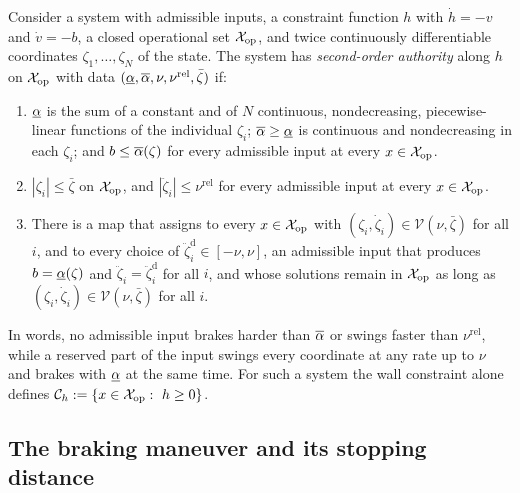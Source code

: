 \begin{definition}\label{def:class}
Consider a system with admissible inputs, a constraint function $h$ with $\dot h=-v$ and $\dot v=-b$, a closed operational set $\mathcal{X}_{\mathrm{op}}$, and twice continuously differentiable coordinates $\zeta_1,\dots,\zeta_N$ of the state. The system has \emph{second-order authority} along $h$ on $\mathcal{X}_{\mathrm{op}}$ with data $(\underline{\alpha},\overline{\alpha},\nu,\nu^{\mathrm{rel}},\bar\zeta)$ if:
\begin{enumerate}
\item[(C1)] $\underline{\alpha}$ is the sum of a constant and of $N$ continuous, nondecreasing, piecewise-linear functions of the individual $\zeta_i$; $\overline{\alpha}\ge\underline{\alpha}$ is continuous and nondecreasing in each $\zeta_i$; and $b\le\overline{\alpha}(\zeta)$ for every admissible input at every $x\in\mathcal{X}_{\mathrm{op}}$.
\item[(C2)] $|\zeta_i|\le\bar\zeta$ on $\mathcal{X}_{\mathrm{op}}$, and $|\ddot\zeta_i|\le\nu^{\mathrm{rel}}$ for every admissible input at every $x\in\mathcal{X}_{\mathrm{op}}$.
\item[(C3)] There is a map that assigns to every $x\in\mathcal{X}_{\mathrm{op}}$ with $(\zeta_i,\dot\zeta_i)\in\mathcal{V}(\nu,\bar\zeta)$ for all $i$, and to every choice of $\ddot\zeta^{\mathrm{d}}_i\in[-\nu,\nu]$, an admissible input that produces $b=\underline{\alpha}(\zeta)$ and $\ddot\zeta_i=\ddot\zeta^{\mathrm{d}}_i$ for all $i$, and whose solutions remain in $\mathcal{X}_{\mathrm{op}}$ as long as $(\zeta_i,\dot\zeta_i)\in\mathcal{V}(\nu,\bar\zeta)$ for all $i$.
\end{enumerate}
\end{definition}

In words, no admissible input brakes harder than $\overline{\alpha}$ or swings faster than $\nu^{\mathrm{rel}}$, while a reserved part of the input swings every coordinate at any rate up to $\nu$ and brakes with $\underline{\alpha}$ at the same time. For such a system the wall constraint alone defines $\mathcal{C}_h:=\{x\in\mathcal{X}_{\mathrm{op}}:\ h\ge0\}$.

\subsection{The braking maneuver and its stopping distance}\label{sec:barrier}


